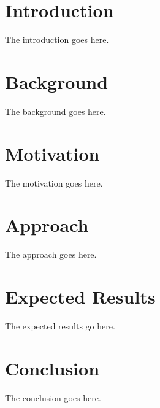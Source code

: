 \documentclass[sigplan,screen]{acmart}
\begin{document}
\section{Introduction}

The introduction goes here.

\section{Background}

The background goes here.

\section{Motivation}

The motivation goes here.

\section{Approach}

The approach goes here.

\section{Expected Results}

The expected results go here.

\section{Conclusion}

The conclusion goes here.




\end{document}
